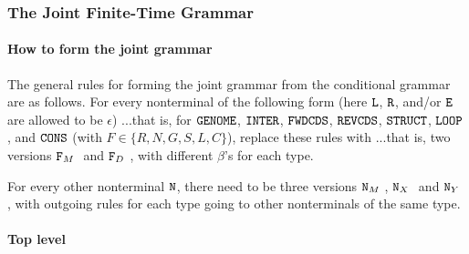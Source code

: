\subsubsection{The Joint Finite-Time Grammar}

\paragraph{How to form the joint grammar}
The general rules for forming the joint grammar from the conditional grammar are as follows.
For every nonterminal of the following form (here $\mbox{\tt L}$, $\mbox{\tt R}$, and/or $\mbox{\tt E}$ are allowed to be $\epsilon$)
...that is, for $\mbox{\tt GENOME}$, $\mbox{\tt INTER}$, $\mbox{\tt FWDCDS}$, $\mbox{\tt REVCDS}$, $\mbox{\tt STRUCT}$, $\mbox{\tt LOOP}$, and $\mbox{\tt CONS}$
(with $F \in \{ R, N, G, S, L, C \}$),
replace these rules with
...that is, two versions $\mbox{\tt F}_M\ $ and $\mbox{\tt F}_D\ $, with different $\beta$'s for each type.

For every other nonterminal $\mbox{\tt N}$, there need to be three versions $\mbox{\tt N}_M\ $, $\mbox{\tt N}_X\ $ and $\mbox{\tt N}_Y\ $,
with outgoing rules for each type going to other nonterminals of the same type.

\paragraph{Top level}

